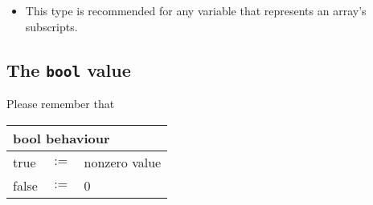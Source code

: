 \begin{itemize}
    \item This type is recommended for any variable that represents an array's subscripts.
\end{itemize}

\subsection{The \texttt{bool} value}
Please remember that\\

\begin{table}[!h]
\centering
\begin{tabular}{lll}
\multicolumn{3}{l}{bool behaviour} \\ 
\hline
true & $:=$ & nonzero value \\
false & $:=$ & 0
\end{tabular}
\end{table}
